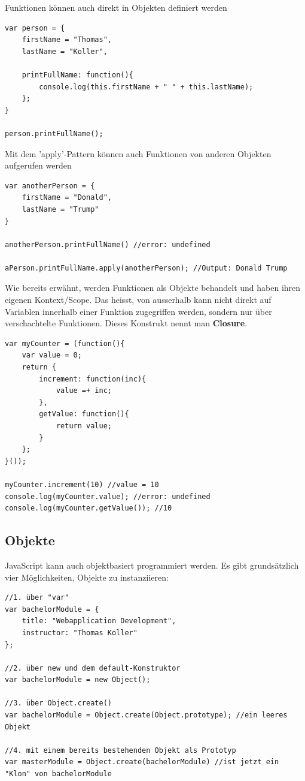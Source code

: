 \documentclass[a4paper, 11pt]{article}
\begin{document}
Funktionen können auch direkt in Objekten definiert werden
\begin{lstlisting}
var person = {
	firstName = "Thomas",
	lastName = "Koller",

	printFullName: function(){
		console.log(this.firstName + " " + this.lastName);
	};
}

person.printFullName();
\end{lstlisting}

Mit dem 'apply'-Pattern können auch Funktionen von anderen Objekten aufgerufen werden

\begin{lstlisting}
var anotherPerson = {
	firstName = "Donald",
	lastName = "Trump"
}

anotherPerson.printFullName() //error: undefined

aPerson.printFullName.apply(anotherPerson); //Output: Donald Trump
\end{lstlisting}

Wie bereits erwähnt, werden Funktionen als Objekte behandelt und haben ihren eigenen Kontext/Scope. Das heisst, von ausserhalb kann nicht direkt auf Variablen innerhalb einer Funktion zugegriffen werden, sondern nur über verschachtelte Funktionen. Dieses Konstrukt nennt man \textbf{Closure}.

\begin{lstlisting}
var myCounter = (function(){
	var value = 0;
	return {
		increment: function(inc){
			value =+ inc;
		},
		getValue: function(){
			return value;
		}
	};
}());

myCounter.increment(10) //value = 10
console.log(myCounter.value); //error: undefined
console.log(myCounter.getValue()); //10
\end{lstlisting}


\subsection{Objekte}
JavaScript kann auch objektbasiert programmiert werden. Es gibt grundsätzlich vier Möglichkeiten, Objekte zu instanziieren:

\begin{lstlisting}
//1. über "var"
var bachelorModule = {
	title: "Webapplication Development",
	instructor: "Thomas Koller"
};

//2. über new und dem default-Konstruktor
var bachelorModule = new Object();

//3. über Object.create()
var bachelorModule = Object.create(Object.prototype); //ein leeres Objekt

//4. mit einem bereits bestehenden Objekt als Prototyp
var masterModule = Object.create(bachelorModule) //ist jetzt ein "Klon" von bachelorModule
\end{lstlisting}
\end{document}
